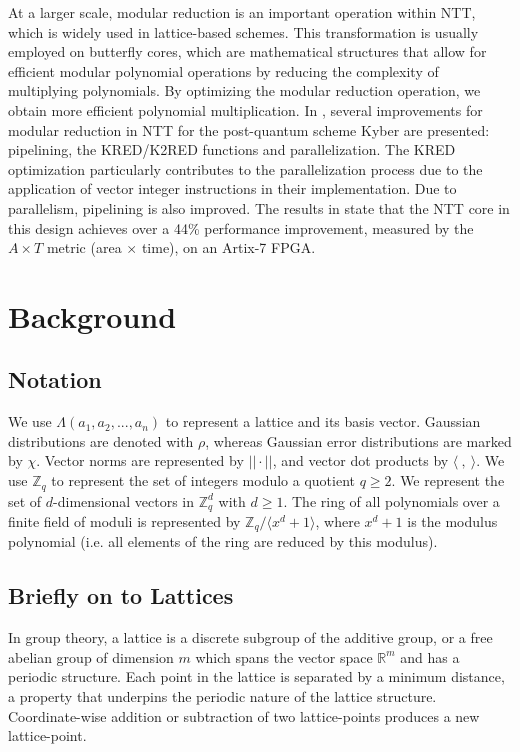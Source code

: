 \documentclass[11pt,
  titlepage=false,
  abstract=on,
]{scrreprt}
\begin{document}
At a larger scale, modular reduction is an important operation within NTT, which is widely used in lattice-based schemes. This transformation is usually employed on butterfly cores, which are mathematical structures that allow for
efficient modular polynomial operations by reducing the complexity of multiplying polynomials. By optimizing the modular reduction operation, we obtain more efficient polynomial multiplication. In \cite{9603378}, several 
improvements  for modular reduction in NTT for the post-quantum scheme Kyber \cite{bos2018crystals} are presented: pipelining, the KRED/K2RED functions \cite{longa2016speeding} and parallelization. The KRED optimization 
particularly contributes to the parallelization process due to the application of vector integer instructions in their implementation. Due to parallelism, pipelining is also improved. The results in \cite{9603378} state 
that the NTT core in this design achieves over a 44\% performance improvement, measured by the $A \times T$ metric (area $\times$ time), on an Artix-7 FPGA.



\section{Background}
\label{sec:background}

\subsection{Notation}
We use $\Lambda(a_1, a_2,..., a_n)$ to represent a lattice and its basis vector. Gaussian distributions are denoted with $\rho$, whereas Gaussian error distributions are marked by $\chi$.
Vector norms are represented by $|| \cdot ||$, and vector dot products by $\langle \ ,\ \rangle$.
We use $\mathbb{Z}_q$ to represent the set of integers modulo a quotient $q \geq 2$. We represent the set of $d$-dimensional vectors in $\mathbb{Z}^d_q$
with $d \geq 1$. The ring of all polynomials over a finite field of moduli is represented by $\mathbb{Z}_q / \langle x^d + 1\rangle$, where $x^d + 1$ is the modulus polynomial 
(i.e. all elements of the ring are reduced by this modulus).
\subsection{Briefly on to Lattices}
In group theory, a lattice is a discrete subgroup of the additive group, or a free abelian group of dimension $m$ which spans the vector space $\mathbb{R}^m$ and has a periodic structure. 
Each point in the lattice is separated by a minimum distance, a property that underpins the periodic nature of the lattice structure. Coordinate-wise addition or subtraction of two lattice-points 
produces a new lattice-point.
\end{document}
